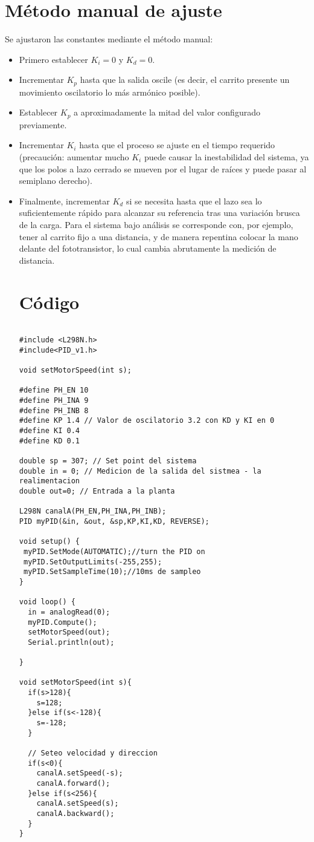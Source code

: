 \documentclass{article}
\begin{document}
\section{Método manual de ajuste}
Se ajustaron las constantes mediante el método manual:
\begin{itemize}
  \item Primero establecer $K_i=0$ y $K_d=0$. 
  \item Incrementar $K_p$ hasta que la salida oscile (es decir, el carrito presente un movimiento oscilatorio lo más armónico posible).
  \item Establecer $K_p$ a aproximadamente la mitad del valor configurado previamente.
  \item Incrementar $K_i$ hasta que el proceso se ajuste en el tiempo requerido (precaución: aumentar mucho $K_i$ puede causar la inestabilidad del sistema, ya que los polos a lazo cerrado se mueven por el lugar de raíces y puede pasar al semiplano derecho).
  \item Finalmente, incrementar $K_d$ si se necesita hasta que el lazo sea lo suficientemente rápido para alcanzar su referencia tras una variación brusca de la carga. Para el sistema bajo análisis se corresponde con, por ejemplo, tener al carrito fijo a una distancia, y de manera repentina colocar la mano delante del fototransistor, lo cual cambia abrutamente la medición de distancia.

 
\newpage
\section{Código}
\begin{lstlisting}

#include <L298N.h>
#include<PID_v1.h>

void setMotorSpeed(int s);

#define PH_EN 10
#define PH_INA 9
#define PH_INB 8
#define KP 1.4 // Valor de oscilatorio 3.2 con KD y KI en 0
#define KI 0.4
#define KD 0.1

double sp = 307; // Set point del sistema
double in = 0; // Medicion de la salida del sistmea - la realimentacion 
double out=0; // Entrada a la planta

L298N canalA(PH_EN,PH_INA,PH_INB);
PID myPID(&in, &out, &sp,KP,KI,KD, REVERSE);

void setup() {
 myPID.SetMode(AUTOMATIC);//turn the PID on
 myPID.SetOutputLimits(-255,255);
 myPID.SetSampleTime(10);//10ms de sampleo
}

void loop() {
  in = analogRead(0);
  myPID.Compute();
  setMotorSpeed(out);
  Serial.println(out);
  
}

void setMotorSpeed(int s){
  if(s>128){
    s=128;
  }else if(s<-128){
    s=-128;
  }

  // Seteo velocidad y direccion
  if(s<0){
    canalA.setSpeed(-s);
    canalA.forward();   
  }else if(s<256){
    canalA.setSpeed(s);
    canalA.backward();    
  }
}

\end{lstlisting}
 
  
\end{itemize}
\end{document}
